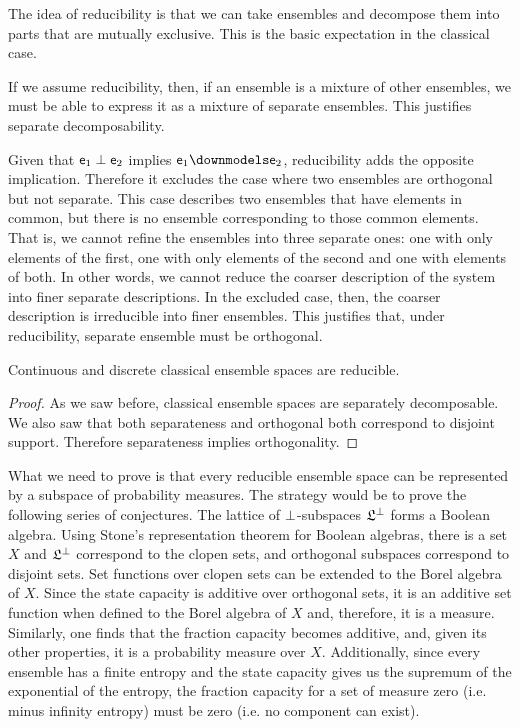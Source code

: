 \begin{justification}
	The idea of reducibility is that we can take ensembles and decompose them into parts that are mutually exclusive. This is the basic expectation in the classical case.
	
	If we assume reducibility, then, if an ensemble is a mixture of other ensembles, we must be able to express it as a mixture of separate ensembles. This justifies separate decomposability.
	
	Given that $\mathsf{e}_1 \perp \mathsf{e}_2$ implies $\ens_1 \separate \ens_2$, reducibility adds the opposite implication. Therefore it excludes the case where two ensembles are orthogonal but not separate. This case describes two ensembles that have elements in common, but there is no ensemble corresponding to those common elements. That is, we cannot refine the ensembles into three separate ones: one with only elements of the first, one with only elements of the second and one with elements of both. In other words, we cannot reduce the coarser description of the system into finer separate descriptions. In the excluded case, then, the coarser description is irreducible into finer ensembles. This justifies that, under reducibility, separate ensemble must be orthogonal.
\end{justification}

\begin{prop}
	Continuous and discrete classical ensemble spaces are reducible.
\end{prop}

\begin{proof}
	As we saw before, classical ensemble spaces are separately decomposable. We also saw that both separateness and orthogonal both correspond to disjoint support. Therefore separateness implies orthogonality.
\end{proof}

What we need to prove is that every reducible ensemble space can be represented by a subspace of probability measures. The strategy would be to prove the following series of conjectures. The lattice of $\perp$-subspaces $\mathfrak{L}^{\perp}$ forms a Boolean algebra. Using Stone's representation theorem for Boolean algebras, there is a set $X$ and $\mathfrak{L}^{\perp}$ correspond to the clopen sets, and orthogonal subspaces correspond to disjoint sets. Set functions over clopen sets can be extended to the Borel algebra of $X$. Since the state capacity is additive over orthogonal sets, it is an additive set function when defined to the Borel algebra of $X$ and, therefore, it is a measure. Similarly, one finds that the fraction capacity becomes additive, and, given its other properties, it is a probability measure over $X$. Additionally, since every ensemble has a finite entropy and the state capacity gives us the supremum of the exponential of the entropy, the fraction capacity for a set of measure zero (i.e. minus infinity entropy) must be zero (i.e. no component can exist). 

